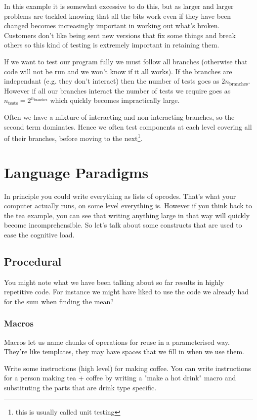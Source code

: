 \documentclass{article}
\begin{document}
In this example it is somewhat excessive to do this, but as larger and larger
problems are tackled knowing that all the bits work even if they have been
changed becomes increasingly important in working out what's broken.
Customers don't like being sent new versions that fix some things and break
others so this kind of testing is extremely important in retaining them.

If we want to test our program fully we must follow all branches (otherwise
that code will not be run and we won't know if it all works).
If the branches are independant (e.g. they don't interact) then the number of
tests goes as $2 n_{\mathrm{branches}}$.
However if all our branches interact the number of tests we require goes as
$n_{\mathrm{tests}} = 2^{n_{\mathrm{branches}}}$ which quickly becomes
impractically large.

Often we have a mixture of interacting and non-interacting branches, so the
second term dominates.
Hence we often test components at each level covering all of their branches,
before moving to the next\footnote{this is usually called unit testing}.

\section{Language Paradigms}
In principle you could write everything as lists of opcodes. That's what your
computer actually runs, on some level everything is. However if you think back
to the tea example, you can see that writing anything large in that way will
quickly become incomprehensible. So let's talk about some constructs that are
used to ease the cognitive load.
\subsection{Procedural}
You might note what we have been talking about so far results in highly
repetitive code.  For instance we might have liked to use the code we already
had for the sum when finding the mean?
\subsubsection{Macros}
Macros let us name chunks of operations for reuse in a parameterised way.
They're like templates, they may have spaces that we fill in when we use them.

Write some instructions (high level) for making coffee.
You can write instructions for a person making tea + coffee by writing a "make
a hot drink" macro and substituting the parts that are drink type specific.
\end{document}
